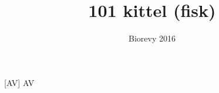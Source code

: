 \documentclass[a4paper,11pt]{article}
\title{101 kittel (fisk)}
\author{Biorevy 2016}
\begin{document}
\maketitle

\begin{roles}
    [AV] AV
\end{roles}

\begin{sketch}


\end{sketch}
\end{document}
